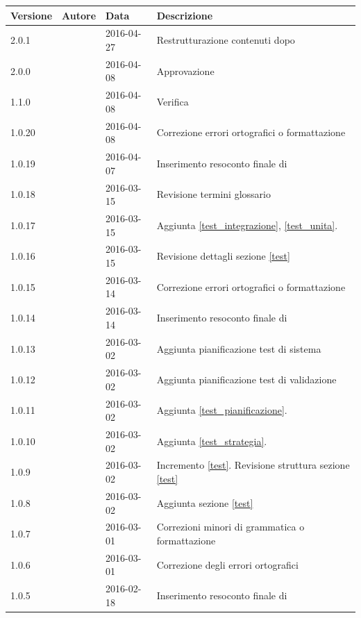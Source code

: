 \documentclass[12pt,a4paper]{article}
\begin{document}
	\begin{center}
		\begin{longtable}[H]{p{} p{} p{} p{}}
			\toprule
			\textbf{Versione}	&	\textbf{Autore}	&	\textbf{Data}	&	\textbf{Descrizione}\\*
			\midrule
				\midrule
				2.0.1 & \AB & 2016-04-27 & Restrutturazione contenuti dopo \RP{}\\*
			\midrule
			2.0.0 & \TP & 2016-04-08 & Approvazione\\*
			\midrule
			1.1.0 & \AVE & 2016-04-08 & Verifica\\*
			\midrule
			1.0.20 & \TP & 2016-04-08 & Correzione errori ortografici o formattazione \\*
			\midrule
			1.0.19 & \TP & 2016-04-07 & Inserimento resoconto finale di \FPD \\*
			\midrule
			1.0.18 & \TP & 2016-03-15 & Revisione termini glossario \\*
			\midrule
			1.0.17 & \TP & 2016-03-15 & Aggiunta \ref{test_integrazione}, \ref{test_unita}.\\*
			\midrule
			1.0.16 & \TP & 2016-03-15 & Revisione dettagli sezione \ref{test}\\*
			\midrule
			1.0.15 & \AB & 2016-03-14 & Correzione errori ortografici o formattazione \\*
			\midrule
			1.0.14 & \AB & 2016-03-14 & Inserimento resoconto finale di \FPA \\*
			\midrule
			1.0.13 & \AB & 2016-03-02 & Aggiunta pianificazione test di sistema\\*
			\midrule
			1.0.12 & \AB & 2016-03-02 & Aggiunta pianificazione test di validazione\\*
			\midrule
			1.0.11 & \AB & 2016-03-02 & Aggiunta \ref{test_pianificazione}.\\*
			\midrule
			1.0.10 & \AB & 2016-03-02 & Aggiunta \ref{test_strategia}.\\*
			\midrule
			1.0.9 & \AB & 2016-03-02 & Incremento \ref{test}. Revisione struttura sezione \ref{test} \\*
			\midrule
			1.0.8 & \AB & 2016-03-02 & Aggiunta sezione \ref{test} \\*
			\midrule
			1.0.7 & \AB{} & 2016-03-01 & Correzioni minori di grammatica o formattazione \\*
			\midrule
			1.0.6 & \AB{} & 2016-03-01 & Correzione degli errori ortografici   \\*
			\midrule
			1.0.5 & \AB & 2016-02-18 &  Inserimento resoconto finale di \FAD \\*

\end{longtable}
\end{center}
\end{document}
